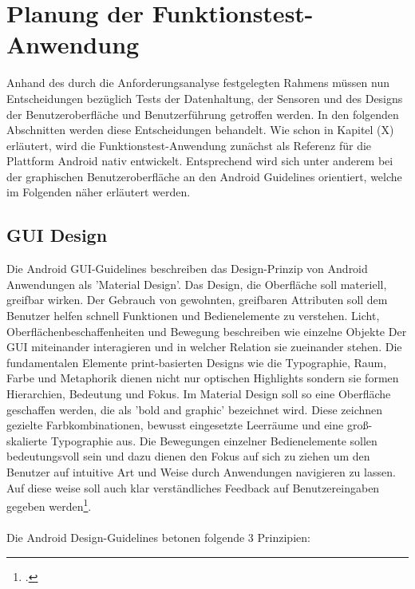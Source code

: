 \chapter{Planung der Funktionstest-Anwendung}

Anhand des durch die Anforderungsanalyse festgelegten Rahmens müssen nun Entscheidungen bezüglich Tests der Datenhaltung, der Sensoren und des Designs der Benutzeroberfläche und Benutzerführung getroffen werden. In den folgenden Abschnitten werden diese Entscheidungen behandelt. Wie schon in Kapitel (X) erläutert, wird die Funktionstest-Anwendung zunächst als Referenz für die Plattform Android nativ entwickelt. Entsprechend wird sich unter anderem bei der graphischen Benutzeroberfläche an den Android Guidelines orientiert, welche im Folgenden näher erläutert werden. 

\section{GUI Design}

Die Android GUI-Guidelines beschreiben das Design-Prinzip von Android Anwendungen als 'Material Design'. Das Design, die Oberfläche soll materiell, greifbar wirken. Der Gebrauch von gewohnten, greifbaren Attributen soll dem Benutzer helfen schnell Funktionen und Bedienelemente zu verstehen. Licht, Oberflächenbeschaffenheiten und Bewegung beschreiben wie einzelne Objekte Der GUI miteinander interagieren und in welcher Relation sie zueinander stehen. Die fundamentalen Elemente print-basierten Designs wie die Typographie, Raum, Farbe und Metaphorik dienen nicht nur optischen Highlights sondern sie formen Hierarchien, Bedeutung und Fokus. Im Material Design soll so eine Oberfläche geschaffen werden, die als 'bold and graphic' bezeichnet wird. Diese zeichnen gezielte Farbkombinationen, bewusst eingesetzte Leerräume und eine groß-skalierte Typographie aus. Die Bewegungen einzelner Bedienelemente sollen bedeutungsvoll sein und dazu dienen den Fokus auf sich zu ziehen um den Benutzer auf intuitive Art und Weise durch Anwendungen navigieren zu lassen. Auf diese weise soll auch klar verständliches Feedback auf Benutzereingaben gegeben werden\footcite{AndroidOnlineGuidelines}. 
\\
\\
Die Android Design-Guidelines betonen folgende 3 Prinzipien:


